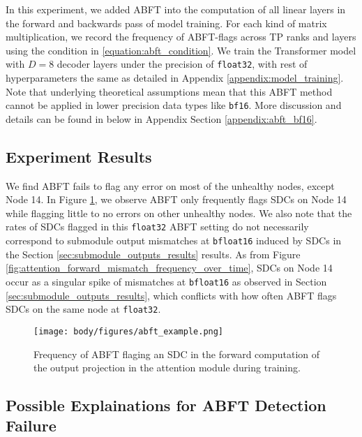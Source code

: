 In this experiment, we added ABFT into the computation of all linear layers in the forward and backwards pass of model training. For each kind of matrix multiplication, we record the frequency of ABFT-flags across TP ranks and layers using the condition in \ref{equation:abft_condition}. We train the Transformer model with $D=8$ decoder layers under the precision of \verb|float32|, with rest of hyperparameters the same as detailed in Appendix \ref{appendix:model_training}. Note that underlying theoretical assumptions mean that this ABFT method cannot be applied in lower precision data types like \verb|bf16|. More discussion and details can be found in below in Appendix Section \ref{appendix:abft_bf16}. 

\subsection{Experiment Results}

We find ABFT fails to flag any error on most of the unhealthy nodes, except Node 14. In Figure \ref{fig:abft_example}, we observe ABFT only frequently flags SDCs on Node 14 while flagging little to no errors on other unhealthy nodes. We also note that the rates of SDCs flagged in this \verb|float32| ABFT setting do not necessarily correspond to submodule output mismatches at \verb|bfloat16| induced by SDCs in the Section \ref{sec:submodule_outputs_results} results. As from Figure \ref{fig:attention_forward_mismatch_frequency_over_time}, SDCs on Node 14 occur as a singular spike of mismatches at \verb|bfloat16| as observed in Section \ref{sec:submodule_outputs_results}, which conflicts with how often ABFT flags SDCs on the same node at \verb|float32|.

\begin{figure}[t]
    \vskip -0.1in
    \centering
    \texttt{[image: body/figures/abft\_example.png]}
    \vskip -0.1in
    \caption{Frequency of ABFT flaging an SDC in the forward computation of the output projection in the attention module during training.}
    \label{fig:abft_example}
    \vskip -0.1in
\end{figure}

\subsection{Possible Explainations for ABFT Detection Failure} \label{appendix:submodule_vs_abft}

